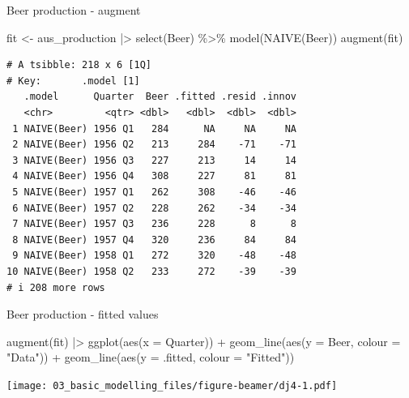\documentclass[
  14pt,
  ignorenonframetext,
  aspectratio=169,
]{beamer}
\newenvironment{Shaded}{\begin{snugshade}}{\end{snugshade}}
\newcommand{\AttributeTok}[1]{\textcolor[rgb]{0.77,0.63,0.00}{#1}}
\newcommand{\FunctionTok}[1]{\textcolor[rgb]{0.00,0.00,0.00}{#1}}
\newcommand{\NormalTok}[1]{\textcolor[rgb]{0.00,0.00,0.00}{#1}}
\newcommand{\OtherTok}[1]{\textcolor[rgb]{0.56,0.35,0.01}{#1}}
\newcommand{\SpecialCharTok}[1]{\textcolor[rgb]{0.00,0.00,0.00}{#1}}
\newcommand{\StringTok}[1]{\textcolor[rgb]{0.31,0.60,0.02}{#1}}
\renewenvironment{Shaded}{\vspace*{0.15cm}\color{black}\fontsize{10}{10}\sf\begin{snugshade}\color{black}}{\end{snugshade}}
\begin{document}
\begin{frame}[fragile]{Beer production - augment}
\protect\hypertarget{beer-production---augment}{}
\fontsize{10}{10}\sf

\begin{Shaded}
\begin{Highlighting}[]
\NormalTok{fit }\OtherTok{\textless{}{-}}\NormalTok{ aus\_production }\SpecialCharTok{|\textgreater{}} \FunctionTok{select}\NormalTok{(Beer) }\SpecialCharTok{\%\textgreater{}\%} \FunctionTok{model}\NormalTok{(}\FunctionTok{NAIVE}\NormalTok{(Beer))}
\FunctionTok{augment}\NormalTok{(fit)}
\end{Highlighting}
\end{Shaded}

\begin{verbatim}
# A tsibble: 218 x 6 [1Q]
# Key:       .model [1]
   .model      Quarter  Beer .fitted .resid .innov
   <chr>         <qtr> <dbl>   <dbl>  <dbl>  <dbl>
 1 NAIVE(Beer) 1956 Q1   284      NA     NA     NA
 2 NAIVE(Beer) 1956 Q2   213     284    -71    -71
 3 NAIVE(Beer) 1956 Q3   227     213     14     14
 4 NAIVE(Beer) 1956 Q4   308     227     81     81
 5 NAIVE(Beer) 1957 Q1   262     308    -46    -46
 6 NAIVE(Beer) 1957 Q2   228     262    -34    -34
 7 NAIVE(Beer) 1957 Q3   236     228      8      8
 8 NAIVE(Beer) 1957 Q4   320     236     84     84
 9 NAIVE(Beer) 1958 Q1   272     320    -48    -48
10 NAIVE(Beer) 1958 Q2   233     272    -39    -39
# i 208 more rows
\end{verbatim}
\end{frame}

\begin{frame}[fragile]{Beer production - fitted values}
\protect\hypertarget{beer-production---fitted-values}{}
\fontsize{10}{10}\sf

\begin{Shaded}
\begin{Highlighting}[]
\FunctionTok{augment}\NormalTok{(fit) }\SpecialCharTok{|\textgreater{}}
  \FunctionTok{ggplot}\NormalTok{(}\FunctionTok{aes}\NormalTok{(}\AttributeTok{x =}\NormalTok{ Quarter)) }\SpecialCharTok{+}
  \FunctionTok{geom\_line}\NormalTok{(}\FunctionTok{aes}\NormalTok{(}\AttributeTok{y =}\NormalTok{ Beer, }\AttributeTok{colour =} \StringTok{"Data"}\NormalTok{)) }\SpecialCharTok{+}
  \FunctionTok{geom\_line}\NormalTok{(}\FunctionTok{aes}\NormalTok{(}\AttributeTok{y =}\NormalTok{ .fitted, }\AttributeTok{colour =} \StringTok{"Fitted"}\NormalTok{))}
\end{Highlighting}
\end{Shaded}

\texttt{[image: 03\_basic\_modelling\_files/figure-beamer/dj4-1.pdf]}
\end{frame}
\end{document}
